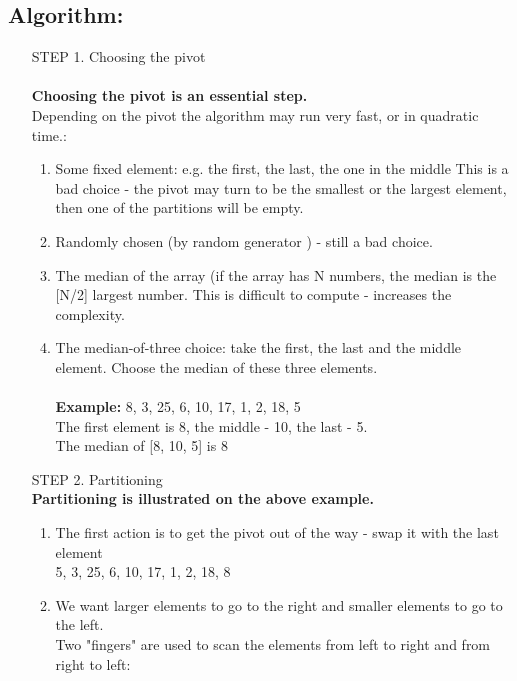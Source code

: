 \documentclass{article}
\begin{document}
	\subsection{Algorithm:}
	\begin{enumerate}
		\item[STEP 1.] Choosing the pivot \\ \\
		\textbf{ Choosing the pivot is an essential step.} \\
		Depending on the pivot the algorithm may run very fast, or in quadratic time.:
		\begin{enumerate}
			\item  Some fixed element: e.g. the first, the last, the one in the middle 
			This is a bad choice - the pivot may turn to be the smallest or the largest element, 
			then one of the partitions will be empty.
			\item Randomly chosen (by random generator ) - still a bad choice. 
			\item The median of the array (if the array has N numbers, the median is the [N/2] largest number. This is difficult to compute - increases the complexity. 
			\item The median-of-three choice: take the first, the last and the middle element. 
			Choose the median of these three elements. \\\\
			\textbf{Example:}
			8, 3, 25, 6, 10, 17, 1, 2, 18, 5 \\
			The first element is 8, the middle - 10, the last - 5. \\
			The median of [8, 10, 5] is 8
			
		\end{enumerate}
		
		\item[STEP 2.]Partitioning \\
		\textbf{Partitioning is illustrated on the above example.}
		\begin{enumerate}
			\item The first action is to get the pivot out of the way - swap it with the last element \\
			5, 3, 25, 6, 10, 17, 1, 2, 18, 8\\
			\item  We want larger elements to go to the right and smaller elements to go to the left.\\
			Two "fingers" are used to scan the elements from left to right and from right to left:\\
			

\end{enumerate}
\end{enumerate}
\end{document}
